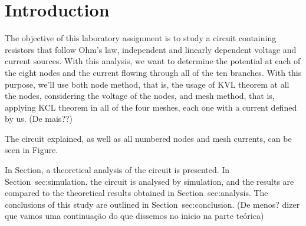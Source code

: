 \section{Introduction}
\label{sec:introduction}

The objective of this laboratory assignment is to study a circuit containing resistors that follow Ohm's law, independent and linearly dependent voltage and current sources. With this analysis, we want to determine the potential at each of the eight nodes and the current flowing through all of the ten branches.
With this purpose, we'll use both node method, that is, the usage of KVL theorem at all the nodes, considering the voltage of the nodes, and mesh method, that is, applying KCL theorem in all of the four meshes, each one with a current defined by us. (De mais??)
\par
The circuit explained, as well as all numbered nodes and mesh currents, can be seen in Figure.



In Section, a theoretical analysis of the circuit is
presented. In Section~{sec:simulation}, the circuit is analysed by
simulation, and the results are compared to the theoretical results obtained in
Section~{sec:analysis}. The conclusions of this study are outlined in
Section~{sec:conclusion}. (De menos? dizer que vamos uma continuação do que dissemos no inicio na parte teórica)
